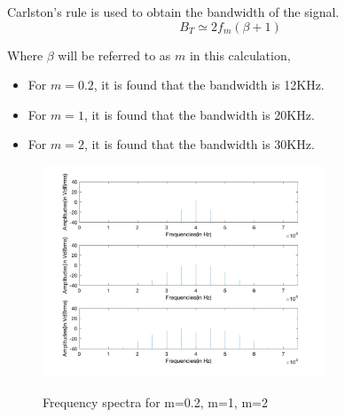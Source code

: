 Carlston's rule is used to obtain the bandwidth of the signal.
\begin{equation}
    B_T \simeq 2f_m(\beta + 1)
\end{equation}

Where $\beta$ will be referred to as $m$ in this calculation,
\begin{itemize}
    \item For $m=0.2$, it is found that the bandwidth is 12KHz.
    \item For $m=1$, it is found that the bandwidth is 20KHz.
    \item For $m=2$, it is found that the bandwidth is 30KHz.
\end{itemize}

\begin{figure}[H]
    \centering
    \includegraphics[width=0.75\textwidth]{images/prelab_6_plot.png}
    \label{fig:prelab_06}
    \caption{Frequency spectra for m=0.2, m=1, m=2}
\end{figure}


